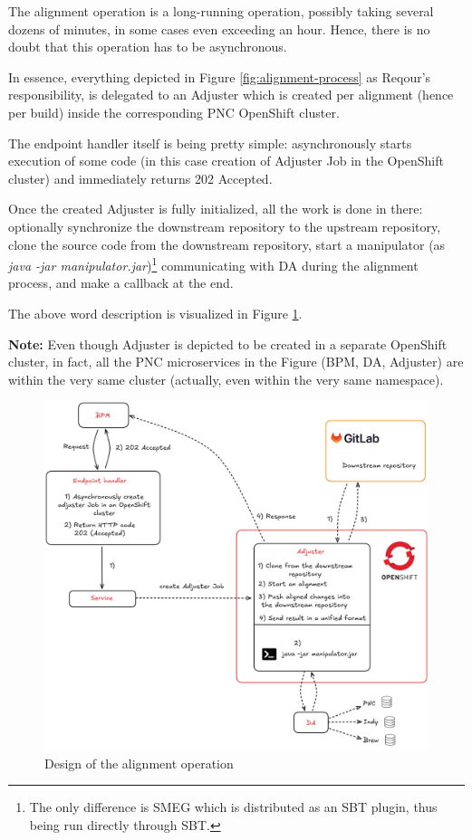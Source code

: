\documentclass[../main.tex]{subfiles}
\begin{document}
The alignment operation is a long-running operation, possibly taking several dozens of minutes, in some cases even exceeding an hour. Hence, there is no doubt that this operation has to be asynchronous.

In essence, everything depicted in Figure \ref{fig:alignment-process} as Reqour's responsibility, is delegated to an Adjuster which is created per alignment (hence per build) inside the corresponding PNC OpenShift cluster.

The endpoint handler itself is being pretty simple: asynchronously starts execution of some code (in this case creation of Adjuster Job in the OpenShift cluster) and immediately returns 202 Accepted.

Once the created Adjuster is fully initialized, all the work is done in there: optionally synchronize the downstream repository to the upstream repository, clone the source code from the downstream repository, start a manipulator (as \textit{java -jar manipulator.jar})\footnote{The only difference is SMEG which is distributed as an SBT plugin, thus being run directly through SBT.} communicating with DA during the alignment process, and make a callback at the end.

The above word description is visualized in Figure \ref{fig:alignment-design}.

\textbf{Note:} Even though Adjuster is depicted to be created in a separate OpenShift cluster, in fact, all the PNC microservices in the Figure (BPM, DA, Adjuster) are within the very same cluster (actually, even within the very same namespace).

\begin{figure}
  \begin{center}
    \includegraphics[width=\textwidth]{images/alignment-design.png}
  \end{center}
  \caption{Design of the alignment operation}
  \label{fig:alignment-design}
\end{figure}
\end{document}
